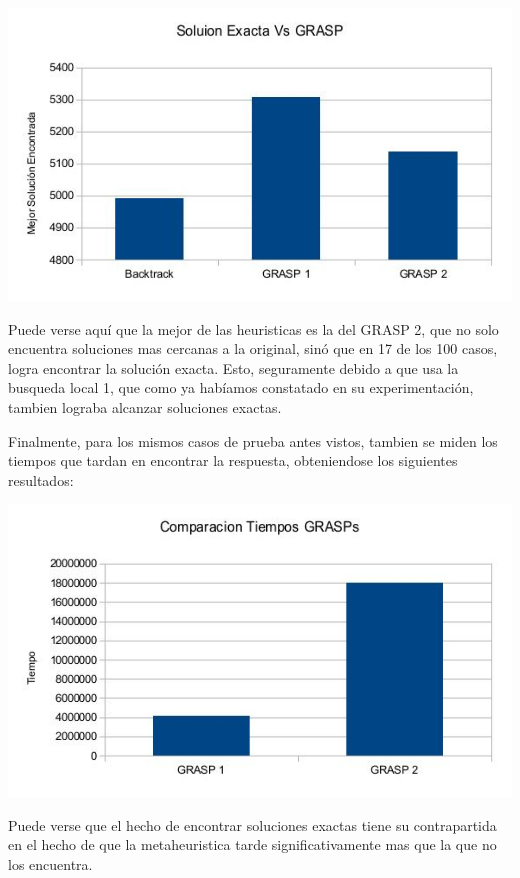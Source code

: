 \includegraphics[scale=0.5]{Ej5/graspSol.jpg}

Puede verse aquí que la mejor de las heuristicas es la del GRASP 2, que no solo encuentra soluciones mas cercanas a la original, sinó que en 17 de los 100 casos, logra encontrar la solución exacta. Esto, seguramente debido a que usa la busqueda local 1, que como ya habíamos constatado en su experimentación, tambien lograba alcanzar soluciones exactas.

Finalmente, para los mismos casos de prueba antes vistos, tambien se miden los tiempos que tardan en encontrar la respuesta, obteniendose los siguientes resultados:

\includegraphics[scale=0.5]{Ej5/tiempos.jpg}

Puede verse que el hecho de encontrar soluciones exactas tiene su contrapartida en el hecho de que la metaheuristica tarde significativamente mas que la que no los encuentra.